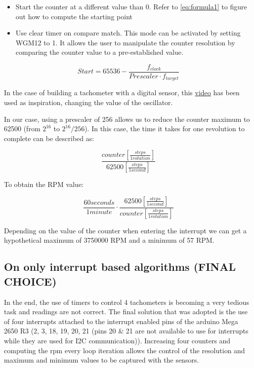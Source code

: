 \documentclass[a4paper]{article}
\begin{document}
\begin{itemize}
	\item Start the counter at a different value than 0. Refer to \autoref{eq:formula1} to figure out how to compute the starting point
	\item Use clear timer on compare match. This mode can be activated by setting WGM12 to 1. It allows the user to manipulate the counter resolution by comparing the counter value to a pre-established value.
\end{itemize}


\begin{equation}
	Start = 65536 - \frac{f_{clock}}{Prescaler\cdot f_{target}}
	\label{eq:formula1}
\end{equation}


In the case of building a tachometer with a digital sensor, this \hyperref{https://www.youtube.com/watch?v=6QZMt4yyylU}{category}{name}{video} has been used as inspiration, changing the value of the oscillator.

In our case, using a prescaler of 256 allows us to reduce the counter maximum to 62500 (from $2^{16}$ to $2^{16}/256$).
In this case, the time it takes for one revolution to complete can be described as:

\begin{equation}
	\frac{counter [\frac{steps}{1rotation}]}{62500 [\frac{steps}{1second}]}
\end{equation} 

To obtain the RPM value:

\begin{equation}
	\frac{60seconds}{1minute}\cdot\frac{62500 [\frac{steps}{1second}]}{counter [\frac{steps}{1rotation}]}
\end{equation}

Depending on the value of the counter when entering the interrupt we can get a hypothetical maximum of 3750000 RPM and a minimum of 57 RPM.

\subsection{On only interrupt based algorithms (FINAL CHOICE)}

In the end, the use of timers to control 4 tachometers is becoming a very tedious task and readings are not correct. The final solution that was adopted is the use of four interrupts attached to the interrupt enabled pins of the arduino Mega 2650 R3 (2, 3, 18, 19, 20, 21 (pins 20 \& 21 are not available to use for interrupts while they are used for I2C communication)). Increasing four counters and computing the rpm every loop iteration allows the control of the resolution and maximum and minimum values to be captured with the sensors.
\end{document}
